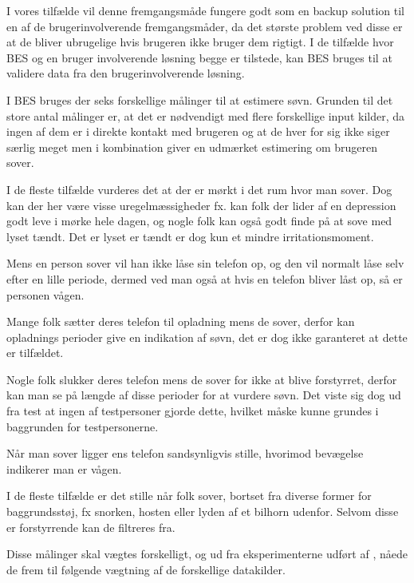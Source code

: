 I vores tilfælde vil denne fremgangsmåde fungere godt som en backup solution til en af de brugerinvolverende fremgangsmåder, da det største problem ved disse er at de bliver ubrugelige hvis brugeren ikke bruger dem rigtigt.
I de tilfælde hvor BES og en bruger involverende løsning begge er tilstede, kan BES bruges til at validere data fra den brugerinvolverende løsning. 

I BES bruges der seks forskellige målinger til at estimere søvn.
Grunden til det store antal målinger er, at det er nødvendigt med flere forskellige input kilder, da ingen af dem er i direkte kontakt med brugeren og at de hver for sig ikke siger særlig meget men i kombination giver en udmærket estimering om brugeren sover.
\begin{description}[style=nextline]
\item[Lys]
I de fleste tilfælde vurderes det at der er mørkt i det rum hvor man sover. Dog kan der her være visse uregelmæssigheder fx. kan folk der lider af en depression godt leve i mørke hele dagen, og nogle folk kan også godt finde på at sove med lyset tændt. Det er lyset er tændt er dog kun et mindre irritationsmoment.
\item[Lås]
Mens en person sover vil han ikke låse sin telefon op, og den vil normalt låse selv efter en lille periode, dermed ved man også at hvis en telefon bliver låst op, så er personen vågen.
\item[Opladning]
Mange folk sætter deres telefon til opladning mens de sover, derfor kan opladnings perioder give en indikation af søvn, det er dog ikke garanteret at dette er tilfældet.
\item[Slukket]
Nogle folk slukker deres telefon mens de sover for ikke at blive forstyrret, derfor kan man se på længde af disse perioder for at vurdere søvn. Det viste sig dog ud fra test at ingen af testpersoner gjorde dette, hvilket måske kunne grundes i baggrunden for testpersonerne. 
\item[Bevægelse]
Når man sover ligger ens telefon sandsynligvis stille, hvorimod bevægelse indikerer man er vågen.
\item[Lyd]
I de fleste tilfælde er det stille når folk sover, bortset fra diverse former for baggrundsstøj, fx snorken, hosten eller  lyden af et bilhorn udenfor. Selvom disse er forstyrrende kan de filtreres fra.
\end{description}
 
Disse målinger skal vægtes forskelligt, og ud fra eksperimenterne udført af \citet{6563918}, nåede de frem til følgende vægtning af de forskellige datakilder.

